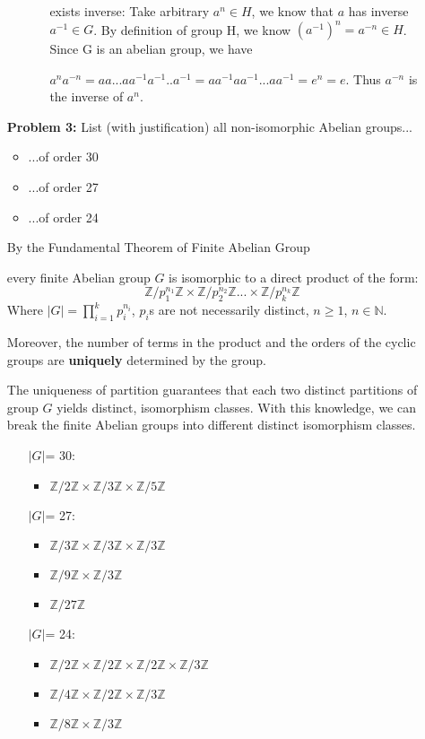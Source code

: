 \documentclass[11pt, oneside]{article}
\newcommand{\N}{\mathbb N}
\newcommand{\Z}{\mathbb Z}
\begin{document}
\begin{enumerate}
\begin{itemize}
\begin{enumerate}
        \item[exists inverse: ] Take arbitrary $a^n\in H$, we know that $a$ has inverse $a^{-1}\in G$. By definition of group H, we know $(a^{-1})^n=a^{-n}\in H$. Since G is an abelian group, we have
        
        $a^na^{-n}=aa...aa^{-1}a^{-1}..a^{-1}=aa^{-1}aa^{-1}...aa^{-1}=e^n=e$. Thus $a^{-n}$ is the inverse of $a^n$. 
    \end{enumerate}
\end{itemize}


\newpage
\item[{\bf Problem 3:}] List (with justification) all non-isomorphic Abelian groups...
\begin{itemize}
\item ...of order 30
\item ...of order 27
\item ...of order 24
\end{itemize}
By the Fundamental Theorem of Finite Abelian Group

every finite Abelian group $G$ is isomorphic to a direct product of the form:
\[\Z/p_1^{n_1}\Z \times \Z/p_2^{n_2}\Z...\times\Z/p_k^{n_k}\Z\]
Where $|G|=\prod_{i=1}^{k}p_i^{n_i}$, $p_i$s are not necessarily distinct, $n\geq 1$, $n\in \N$. 

Moreover, the number of terms in the product and the orders of the cyclic groups are \textbf{uniquely} determined by the group.

The uniqueness of partition guarantees that each two distinct partitions of group $G$ yields distinct, isomorphism classes. With this knowledge, we can break the finite Abelian groups into different distinct isomorphism classes.

\begin{enumerate}
    \item[$|G|$= 30:] \begin{itemize}
        \item $\Z/2\Z \times \Z/3\Z\times\Z/5\Z$
    \end{itemize}
    \item[$|G|$= 27:] \begin{itemize}
        \item $\Z/3\Z \times \Z/3\Z\times\Z/3\Z$
        \item $\Z/9\Z \times \Z/3\Z$
        \item $\Z/27\Z$
    \end{itemize}
    \item[$|G|$= 24:]\begin{itemize}
        \item $\Z/2\Z \times \Z/2\Z\times\Z/2\Z\times\Z/3\Z$
        \item $ \Z/4\Z\times\Z/2\Z\times\Z/3\Z$
        \item $ \Z/8\Z\times\Z/3\Z$


\end{itemize}
\end{enumerate}
\end{enumerate}
\end{document}
